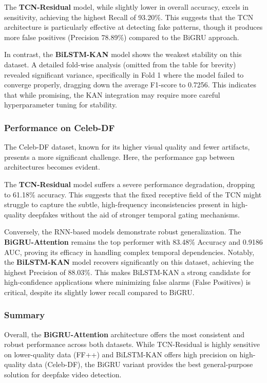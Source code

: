 \documentclass[conference]{IEEEtran}
\begin{document}
The \textbf{TCN-Residual} model, while slightly lower in overall accuracy, excels in sensitivity, achieving the highest Recall of 93.20\%. This suggests that the TCN architecture is particularly effective at detecting fake patterns, though it produces more false positives (Precision 78.89\%) compared to the BiGRU approach.

In contrast, the \textbf{BiLSTM-KAN} model shows the weakest stability on this dataset. A detailed fold-wise analysis (omitted from the table for brevity) revealed significant variance, specifically in Fold 1 where the model failed to converge properly, dragging down the average F1-score to 0.7256. This indicates that while promising, the KAN integration may require more careful hyperparameter tuning for stability.

\subsubsection{Performance on Celeb-DF}
The Celeb-DF dataset, known for its higher visual quality and fewer artifacts, presents a more significant challenge. Here, the performance gap between architectures becomes evident.

The \textbf{TCN-Residual} model suffers a severe performance degradation, dropping to 61.18\% accuracy. This suggests that the fixed receptive field of the TCN might struggle to capture the subtle, high-frequency inconsistencies present in high-quality deepfakes without the aid of stronger temporal gating mechanisms.

Conversely, the RNN-based models demonstrate robust generalization. The \textbf{BiGRU-Attention} remains the top performer with 83.48\% Accuracy and 0.9186 AUC, proving its efficacy in handling complex temporal dependencies. Notably, the \textbf{BiLSTM-KAN} model recovers significantly on this dataset, achieving the highest Precision of 88.03\%. This makes BiLSTM-KAN a strong candidate for high-confidence applications where minimizing false alarms (False Positives) is critical, despite its slightly lower recall compared to BiGRU.

\subsubsection{Summary}
Overall, the \textbf{BiGRU-Attention} architecture offers the most consistent and robust performance across both datasets. While TCN-Residual is highly sensitive on lower-quality data (FF++) and BiLSTM-KAN offers high precision on high-quality data (Celeb-DF), the BiGRU variant provides the best general-purpose solution for deepfake video detection.
\end{document}
